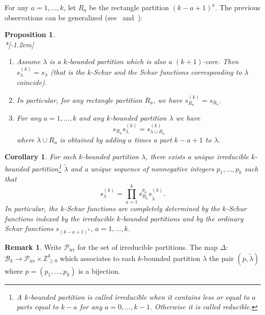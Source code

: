 \documentclass[10pt,a4paper]{amsart}
\newtheorem{prop}[theorem]{Proposition}
\newtheorem{coro}[theorem]{Corollary}
\theoremstyle{definition}
\newtheorem{rema}[theorem]{Remark}
\DeclareMathOperator{\irr}{irr}
\begin{document}

For any $a=1,\ldots,k$, let $R_{a}$ be the rectangle partition $(k-a+1)^{a}$.
The previous observations can be generalized (see~\cite[Corollary~8.3]{LamLR}  and~\cite[Section~4]{LLMSSZ}):

\begin{prop}\ \\*[-1.2em] 

\begin{enumerate}
\item Assume $\lambda$ is a $k$-bounded partition which is also a
$(k+1)$-core. Then $s_{\lambda}^{(k)}=s_{\lambda}$ (that is the $k$-Schur and
the Schur functions corresponding to $\lambda$ coincide).

\item In particular, for any rectangle partition $R_{a}$, we have $s_{R_{a}%
}^{(k)}=s_{R_{a}}$.

\item For any $a=1,\ldots,k$ and any $k$-bounded partition $\lambda$ we have
\[
s_{R_{a}}s_{\lambda}^{(k)}=s_{\lambda\cup R_{a}}^{(k)}%
\]
where $\lambda\cup R_{a}$ is obtained by adding $a$ times a part $k-a+1$ to
$\lambda$.
\end{enumerate}
\end{prop}

\begin{coro}\label{reducedCase} 
For each $k$-bounded partition $\lambda$, there exists a
unique irreducible $k$-bounded partition\footnote{A $k$-bounded partition is
called irreducible when it contains less or equal to $a$ parts equal to $k-a$ for any
$a=0,\ldots,k-1$. Otherwise it is called reducible.} $\widetilde{\lambda}$ and a unique sequence of nonnegative
integers $p_{1},\ldots,p_{k}$ such that
\[
s_{\lambda}^{(k)}=\prod_{a=1}^{k}s_{R_{a}}^{p_{a}}s_{\widetilde{\lambda}%
}^{(k)}.
\]
In particular, the $k$-Schur functions are completely determined by the
$k$-Schur functions indexed by the irreducible $k$-bounded partitions and by
the ordinary Schur functions $s_{(k-a+1)^{a}}$, $a=1,\ldots,k$.
\end{coro}

\begin{rema}
\label{Rem_bij}Write $\mathcal{P}_{\irr }$ for the set of irreducible
partitions. The map $\Delta:$ $\mathcal{B}_{k}\rightarrow\mathcal{P}%
_{\irr }\times\mathbb{Z}_{\geq0}^{k}$ which associates to each
$k$-bounded partition $\lambda$ the pair $(p,\widetilde{\lambda})$ where
$p=(p_{1},\ldots,p_{k})$ is a bijection.
\end{rema}
\end{document}
